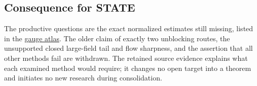 \documentclass[11pt,a4paper]{article}
\begin{document}
\hypertarget{consequence-for-state}{%
\subsection{Consequence for STATE}\label{consequence-for-state}}

The productive questions are the exact normalized estimates still
missing, listed in the \href{halving-atlas.md}{gauge atlas}. The older
claim of exactly two unblocking routes, the unsupported closed
large-field tail and flow sharpness, and the assertion that all other
methods fail are withdrawn. The retained source evidence explains what
each examined method would require; it changes no open target into a
theorem and initiates no new research during consolidation.
\end{document}
